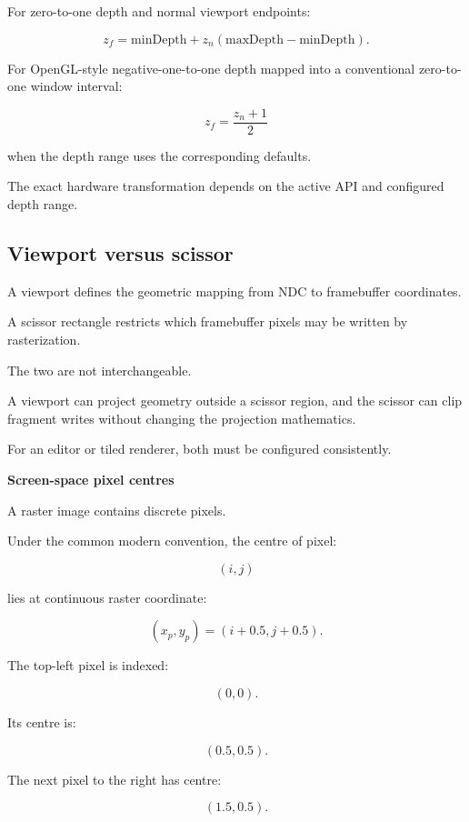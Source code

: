\hypertarget{02-foundations-ii-ch033-viewport-depth-mapping}{}

For zero-to-one depth and normal viewport endpoints:

\[
 \boxed{ z_f=\mathrm{minDepth} + z_n(\mathrm{maxDepth}-\mathrm{minDepth}) }.
\]

For OpenGL-style negative-one-to-one depth mapped into a conventional zero-to-one window interval:

\[
 \boxed{ z_f=\frac{z_n+1}{2} }
\]

when the depth range uses the corresponding defaults.

The exact hardware transformation depends on the active API and configured depth range.

\subsection{Viewport versus scissor}\label{02-foundations-ii-ch033-viewport-versus-scissor}

\hypertarget{02-foundations-ii-ch033-viewport-versus-scissor}{}

A viewport defines the geometric mapping from NDC to framebuffer coordinates.

A scissor rectangle restricts which framebuffer pixels may be written by rasterization.

The two are not interchangeable.

A viewport can project geometry outside a scissor region, and the scissor can clip fragment writes without changing the projection mathematics.

For an editor or tiled renderer, both must be configured consistently.

\textbf{Screen-space pixel centres}

A raster image contains discrete pixels.

Under the common modern convention, the centre of pixel:

\[
 (i,j)
\]

lies at continuous raster coordinate:

\[
 \boxed{ (x_p,y_p)=(i+0.5,j+0.5) }.
\]

The top-left pixel is indexed:

\[
 (0,0).
\]

Its centre is:

\[
 \boxed{(0.5,0.5)}.
\]

The next pixel to the right has centre:

\[
 (1.5,0.5).
\]

